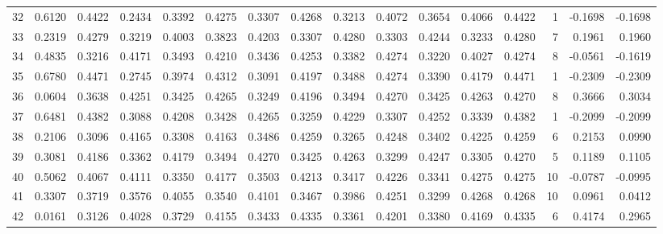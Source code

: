 \begin{tabular}{lrrrrrrrrrrrrrrr}
32  &      0.6120 &  0.4422 &  0.2434 &  0.3392 &  0.4275 &  0.3307 &  0.4268 &  0.3213 &  0.4072 &  0.3654 &   0.4066 &     0.4422 &      1 &                   -0.1698 &                    -0.1698 \\
33  &      0.2319 &  0.4279 &  0.3219 &  0.4003 &  0.3823 &  0.4203 &  0.3307 &  0.4280 &  0.3303 &  0.4244 &   0.3233 &     0.4280 &      7 &                    0.1961 &                     0.1960 \\
34  &      0.4835 &  0.3216 &  0.4171 &  0.3493 &  0.4210 &  0.3436 &  0.4253 &  0.3382 &  0.4274 &  0.3220 &   0.4027 &     0.4274 &      8 &                   -0.0561 &                    -0.1619 \\
35  &      0.6780 &  0.4471 &  0.2745 &  0.3974 &  0.4312 &  0.3091 &  0.4197 &  0.3488 &  0.4274 &  0.3390 &   0.4179 &     0.4471 &      1 &                   -0.2309 &                    -0.2309 \\
36  &      0.0604 &  0.3638 &  0.4251 &  0.3425 &  0.4265 &  0.3249 &  0.4196 &  0.3494 &  0.4270 &  0.3425 &   0.4263 &     0.4270 &      8 &                    0.3666 &                     0.3034 \\
37  &      0.6481 &  0.4382 &  0.3088 &  0.4208 &  0.3428 &  0.4265 &  0.3259 &  0.4229 &  0.3307 &  0.4252 &   0.3339 &     0.4382 &      1 &                   -0.2099 &                    -0.2099 \\
38  &      0.2106 &  0.3096 &  0.4165 &  0.3308 &  0.4163 &  0.3486 &  0.4259 &  0.3265 &  0.4248 &  0.3402 &   0.4225 &     0.4259 &      6 &                    0.2153 &                     0.0990 \\
39  &      0.3081 &  0.4186 &  0.3362 &  0.4179 &  0.3494 &  0.4270 &  0.3425 &  0.4263 &  0.3299 &  0.4247 &   0.3305 &     0.4270 &      5 &                    0.1189 &                     0.1105 \\
40  &      0.5062 &  0.4067 &  0.4111 &  0.3350 &  0.4177 &  0.3503 &  0.4213 &  0.3417 &  0.4226 &  0.3341 &   0.4275 &     0.4275 &     10 &                   -0.0787 &                    -0.0995 \\
41  &      0.3307 &  0.3719 &  0.3576 &  0.4055 &  0.3540 &  0.4101 &  0.3467 &  0.3986 &  0.4251 &  0.3299 &   0.4268 &     0.4268 &     10 &                    0.0961 &                     0.0412 \\
42  &      0.0161 &  0.3126 &  0.4028 &  0.3729 &  0.4155 &  0.3433 &  0.4335 &  0.3361 &  0.4201 &  0.3380 &   0.4169 &     0.4335 &      6 &                    0.4174 &                     0.2965 \\

\end{tabular}

